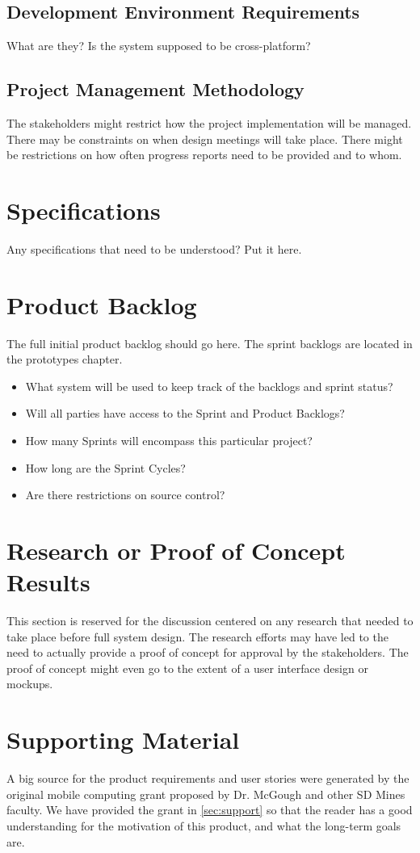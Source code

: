 \subsection{Development Environment Requirements}
What are they?  Is the system supposed to be cross-platform? 

\subsection{Project  Management Methodology}
The stakeholders might restrict how the project implementation will be managed. 
 There may be constraints on when design meetings will take place.  There might 
be restrictions on how often progress reports need to be provided and to whom. 


\section{Specifications}
Any specifications that need to be understood?  Put it here.  

\section{Product Backlog}
The full initial product backlog should go here.  The sprint backlogs are located in the prototypes chapter.

 
\begin{itemize}
\item What system will be used to keep track of the backlogs and sprint status?
\item Will all parties have access to the Sprint and Product Backlogs?
\item How many Sprints will encompass this particular project?
\item How long are the Sprint Cycles?
\item Are there restrictions on source control? 
\end{itemize}


\section{Research or Proof of Concept Results}
This section is reserved for the discussion centered on any research that needed 
to take place before full system design.  The research efforts may have led to 
the need to actually provide a proof of concept for approval by the stakeholders. 
 The proof of concept might even go to the extent of a user interface design or 
mockups. 


\section{Supporting Material}


A big source for the product requirements and user stories were generated by 
the original mobile computing grant proposed by Dr. McGough and other SD Mines 
faculty. We have provided the grant in \autoref{sec:support} so that the reader 
has a good understanding for the motivation of this product, and what the 
long-term goals are.

